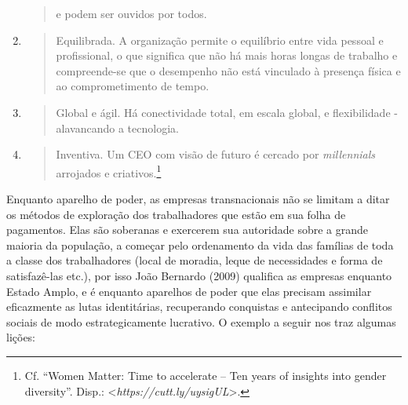 \begin{enumerate}
\begin{quote}
  e podem ser ouvidos por todos.
  \end{quote}
\item
  \begin{quote}
  Equilibrada. A organização permite o equilíbrio entre vida pessoal e
  profissional, o que significa que não há mais horas longas de trabalho
  e compreende-se que o desempenho não está vinculado à presença física
  e ao comprometimento de tempo.
  \end{quote}
\item
  \begin{quote}
  Global e ágil. Há conectividade total, em escala global, e
  flexibilidade - alavancando a tecnologia.
  \end{quote}
\item
  \begin{quote}
  Inventiva. Um CEO com visão de futuro é cercado por \emph{millennials}
  arrojados e criativos.\footnote{Cf. ``Women Matter: Time to accelerate
    -- Ten years of insights into gender diversity''. Disp.:
    \textless{}\emph{https://cutt.ly/uysigUL}\textgreater{}.}
  \end{quote}
\end{enumerate}

Enquanto aparelho de poder, as empresas transnacionais não se limitam a
ditar os métodos de exploração dos trabalhadores que estão em sua folha
de pagamentos. Elas são soberanas e exercerem sua autoridade sobre a
grande maioria da população, a começar pelo ordenamento da vida das
famílias de toda a classe dos trabalhadores (local de moradia, leque de
necessidades e forma de satisfazê-las etc.), por isso João Bernardo
(2009) qualifica as empresas enquanto Estado Amplo, e é enquanto
aparelhos de poder que elas precisam assimilar eficazmente as lutas
identitárias, recuperando conquistas e antecipando conflitos sociais de
modo estrategicamente lucrativo. O exemplo a seguir nos traz algumas
lições:

